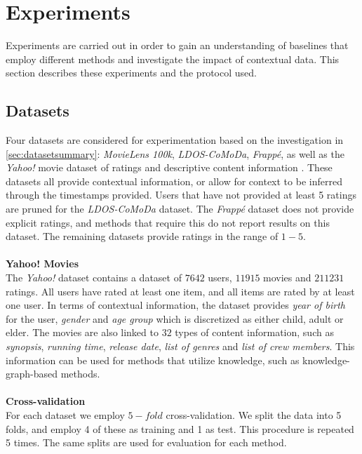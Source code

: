 \section{Experiments}
Experiments are carried out in order to gain an understanding of baselines that employ different methods and investigate the impact of contextual data.
This section describes these experiments and the protocol used.

\subsection{Datasets}
Four datasets are considered for experimentation based on the investigation in \autoref{sec:datasetsummary}: \textit{MovieLens 100k}, \textit{LDOS-CoMoDa}, \textit{Frappé}, as well as the \textit{Yahoo!} movie dataset of ratings and descriptive content information \cite{yahoo-movie}.
These datasets all provide contextual information, or allow for context to be inferred through the timestamps provided.
Users that have not provided at least 5 ratings are pruned for the \textit{LDOS-CoMoDa} dataset.
The \textit{Frappé} dataset does not provide explicit ratings, and methods that require this do not report results on this dataset.
The remaining datasets provide ratings in the range of $1-5$.
\\\\
\textbf{Yahoo! Movies}\\
The \textit{Yahoo!} dataset contains a dataset of $7642$ users, $11915$ movies and $211231$ ratings.
All users have rated at least one item, and all items are rated by at least one user.
In terms of contextual information, the dataset provides \textit{year of birth} for the user, \textit{gender} and \textit{age group} which is discretized as either child, adult or elder.
The movies are also linked to $32$ types of content information, such as \textit{synopsis}, \textit{running time}, \textit{release date}, \textit{list of genres} and \textit{list of crew members}.
This information can be used for methods that utilize knowledge, such as knowledge-graph-based methods.
\\\\
\textbf{Cross-validation}\\
For each dataset we employ $5-fold$ cross-validation.
We split the data into 5 folds, and employ 4 of these as training and 1 as test.
This procedure is repeated 5 times.
The same splits are used for evaluation for each method.

